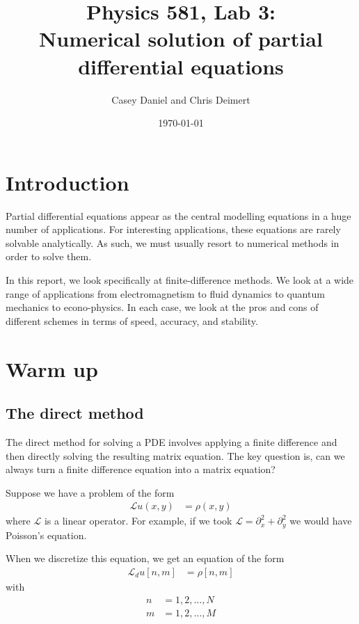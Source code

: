 \documentclass[twocolumn]{myarticle}
\begin{document}
\title{Physics 581, Lab 3:\\Numerical solution of partial differential equations}
\author{Casey Daniel and Chris Deimert}
\date{\today}

\maketitle

\section{Introduction}
\label{sec:introduction}

Partial differential equations appear as the central modelling equations in a huge number of applications.
For interesting applications, these equations are rarely solvable analytically.
As such, we must usually resort to numerical methods in order to solve them.

In this report, we look specifically at finite-difference methods.
We look at a wide range of applications from electromagnetism to fluid dynamics to quantum mechanics to econo-physics.
In each case, we look at the pros and cons of different schemes in terms of speed, accuracy, and stability.

\section{Warm up}
\label{sec:warm_up}

\subsection{The direct method}
\label{subsec:the_direct_method}

The direct method for solving a PDE involves applying a finite difference and then directly solving the resulting matrix equation.
The key question is, can we always turn a finite difference equation into a matrix equation?

Suppose we have a problem of the form
\begin{align}
    \mathcal{L} u(x, y) &= \rho(x, y)
\end{align}
where $ \mathcal{L} $ is a linear operator.
For example, if we took $ \mathcal{L} = \partial_x^2 + \partial_y^2 $ we would have Poisson's equation.

When we discretize this equation, we get an equation of the form
\begin{align}
    \mathcal{L}_d u[n,m] &= \rho[n, m] \label{eq:general_difference_eq}
\end{align}
with
\begin{align}
    n &= 1, 2, \ldots, N
    \\
    m &= 1, 2, \ldots, M
\end{align}
\end{document}
